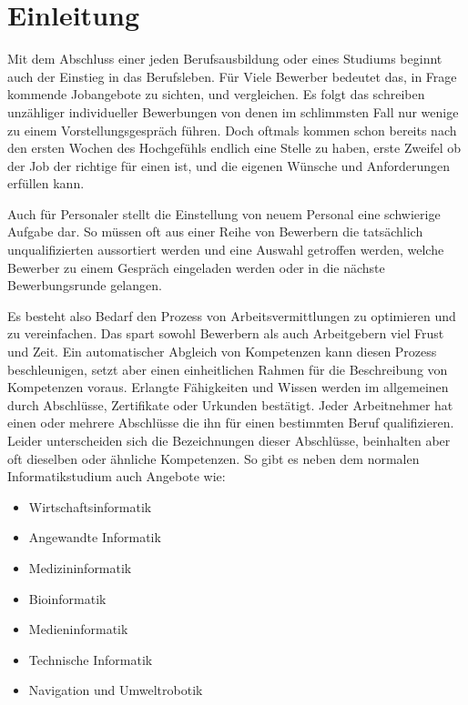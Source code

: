 \section{Einleitung}\label{1_einleitung}

Mit dem Abschluss einer jeden Berufsausbildung oder eines Studiums beginnt auch der Einstieg in das Berufsleben. Für Viele Bewerber bedeutet das, in Frage kommende Jobangebote zu sichten, und vergleichen. Es folgt das schreiben unzähliger individueller Bewerbungen von denen im schlimmsten Fall nur wenige zu einem Vorstellungsgespräch führen. Doch oftmals kommen schon bereits nach den ersten Wochen des Hochgefühls endlich eine Stelle zu haben, erste Zweifel ob der Job der richtige für einen ist, und die eigenen Wünsche und Anforderungen erfüllen kann.

Auch für Personaler stellt die Einstellung von neuem Personal eine schwierige Aufgabe dar. So müssen oft aus einer Reihe von Bewerbern die tatsächlich unqualifizierten aussortiert werden und eine Auswahl getroffen werden, welche Bewerber zu einem Gespräch eingeladen werden oder in die nächste Bewerbungsrunde gelangen.
 
Es besteht also Bedarf den Prozess von Arbeitsvermittlungen zu optimieren und zu vereinfachen. Das spart sowohl Bewerbern als auch Arbeitgebern viel Frust und Zeit. Ein automatischer Abgleich von Kompetenzen kann diesen Prozess beschleunigen, setzt aber einen einheitlichen Rahmen für die Beschreibung von Kompetenzen voraus. 
 \vspace{1em}
Erlangte Fähigkeiten und Wissen werden im allgemeinen durch Abschlüsse, Zertifikate oder Urkunden bestätigt. Jeder Arbeitnehmer hat einen oder mehrere Abschlüsse die ihn für einen bestimmten Beruf qualifizieren. Leider unterscheiden sich die Bezeichnungen dieser Abschlüsse, beinhalten aber oft dieselben oder ähnliche Kompetenzen. So gibt es neben dem normalen Informatikstudium auch Angebote wie: 
 
\begin{itemize}
  \item Wirtschaftsinformatik
  \item Angewandte Informatik
  \item Medizininformatik
\item Bioinformatik
\item Medieninformatik
\item Technische Informatik
\item Navigation und Umweltrobotik

\end{itemize}

